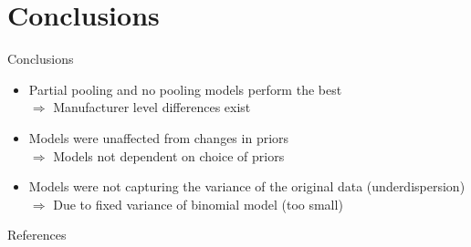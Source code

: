 \documentclass{beamer}
\begin{document}
\section{Conclusions}

\begin{frame}{Conclusions}

    \begin{itemize}
        \item Partial pooling and no pooling models perform the best \\
              $\Rightarrow$ Manufacturer level differences exist
        \item Models were unaffected from changes in priors \\
              $\Rightarrow$ Models not dependent on choice of priors
        \item Models were not capturing the variance of the original data (underdispersion) \\
              $\Rightarrow$ Due to fixed variance of binomial model (too small)
    \end{itemize}

\end{frame}



\begin{frame}[allowframebreaks]{References}
    
    
\end{frame}
\end{document}
